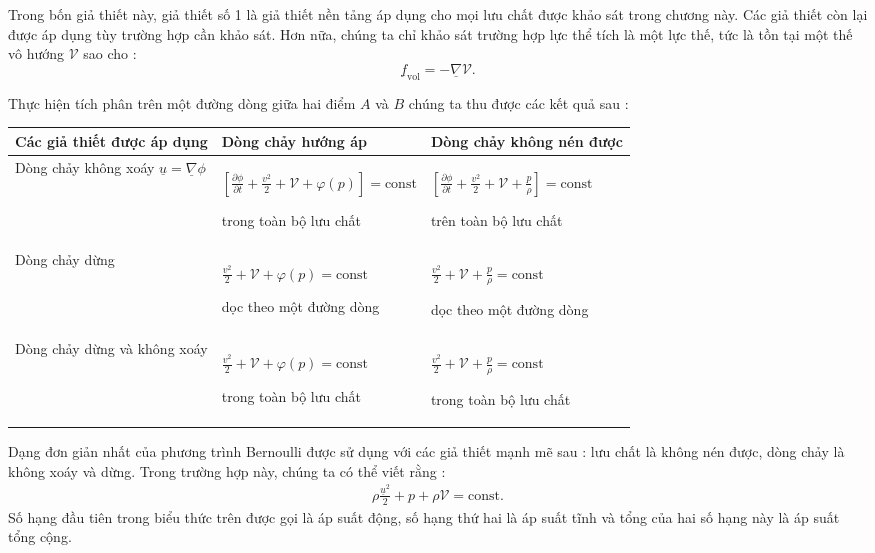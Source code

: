 \documentclass[CO_LUU_CHAT.tex]{subfiles}
\begin{document}
Trong bốn giả thiết này, giả thiết số 1 là giả thiết nền tảng áp dụng cho mọi lưu chất được khảo sát trong chương này. Các giả thiết còn lại được áp dụng tùy trường hợp cần khảo sát. Hơn nữa, chúng ta chỉ khảo sát trường hợp lực thể tích là một lực thế, tức là tồn tại một thế vô hướng $\mathscr{V}$ sao cho :
$$
	\underline{f}_{\text{vol}}=-\underline{\nabla}\mathscr{V}.
$$

Thực hiện tích phân trên một đường dòng giữa hai điểm $A$ và $B$ chúng ta thu được các kết quả sau :
\begin{center}
	\begin{tabular}{|p{3.5cm}|p{6cm}|p{6cm}|}
		\hline
		Các giả thiết được áp dụng & Dòng chảy hướng áp & Dòng chảy không nén được\\
		\hline
		Dòng chảy không xoáy
		$\underline{u}=\underline{\nabla}\phi$
		&
		\shortstack{\\$\displaystyle\left[\frac{\partial\phi}{\partial t}+\frac{v^2}{2}+\mathscr{V}+\varphi(p)\right]=\text{const}$}
		
		trong toàn bộ lưu chất
		&
		$\displaystyle\left[\frac{\partial\phi}{\partial t}+\frac{v^2}{2}+\mathscr{V}+\frac{p}{\rho}\right]=\text{const}$

		trên toàn bộ lưu chất\\
		\hline
		Dòng chảy dừng
		&
		\shortstack{\\$\displaystyle\frac{v^2}{2}+\mathscr{V}+\varphi(p)=\text{const}$}

		dọc theo một đường dòng
		&

		$\displaystyle\frac{v^2}{2}+\mathscr{V}+\frac{p}{\rho}=\text{const}$
		
		dọc theo một đường dòng
		\\
		\hline
		Dòng chảy dừng và không xoáy
		&
		\shortstack{\\$\displaystyle\frac{v^2}{2}+\mathscr{V}+\varphi(p)=\text{const}$}
		
		trong toàn bộ lưu chất
		&
		$\displaystyle\frac{v^2}{2}+\mathscr{V}+\frac{p}{\rho}=\text{const}$
		
		trong toàn bộ lưu chất\\
		\hline
	\end{tabular}
\end{center}

Dạng đơn giản nhất của phương trình Bernoulli được sử dụng với các giả thiết mạnh mẽ sau : lưu chất là không nén được, dòng chảy là không xoáy và dừng. Trong trường hợp này, chúng ta có thể viết rằng :
\begin{equation}
	\begin{aligned}
		\boxed{
			\rho\frac{\underline{u}^2}{2}+p+\rho\mathscr{V}=\text{const}
		}.
	\end{aligned}
\end{equation}
Số hạng đầu tiên trong biểu thức trên được gọi là áp suất động, số hạng thứ hai là áp suất tĩnh và tổng của hai số hạng này là áp suất tổng cộng.
\end{document}
